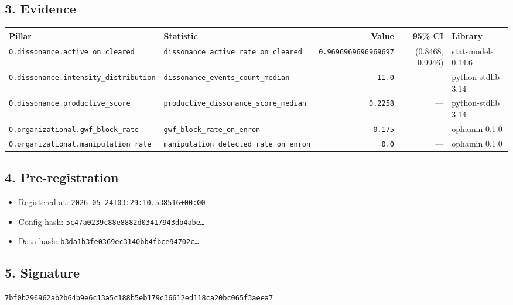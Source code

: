 \documentclass{article}
\begin{document}
\subsection*{3. Evidence}
\begin{tabular}{llrrl}\toprule
\textbf{Pillar} & \textbf{Statistic} & \textbf{Value} & \textbf{95\% CI} & \textbf{Library} \\\midrule
\texttt{O.dissonance.active\_on\_cleared} & \texttt{dissonance\_active\_rate\_on\_cleared} & \texttt{0.9696969696969697} & (0.8468, 0.9946) & statsmodels 0.14.6 \\
\texttt{O.dissonance.intensity\_distribution} & \texttt{dissonance\_events\_count\_median} & \texttt{11.0} & --- & python-stdlib 3.14 \\
\texttt{O.dissonance.productive\_score} & \texttt{productive\_dissonance\_score\_median} & \texttt{0.2258} & --- & python-stdlib 3.14 \\
\texttt{O.organizational.gwf\_block\_rate} & \texttt{gwf\_block\_rate\_on\_enron} & \texttt{0.175} & --- & ophamin 0.1.0 \\
\texttt{O.organizational.manipulation\_rate} & \texttt{manipulation\_detected\_rate\_on\_enron} & \texttt{0.0} & --- & ophamin 0.1.0 \\
\bottomrule\end{tabular}
\subsection*{4. Pre-registration}
\begin{itemize}
\item Registered at: \texttt{2026-05-24T03:29:10.538516+00:00}
\item Config hash: \texttt{5c47a0239c88e8882d03417943db4abe\dots}
\item Data hash: \texttt{b3da1b3fe0369ec3140bb4fbce94702c\dots}
\end{itemize}
\subsection*{5. Signature}
\texttt{7bf0b296962ab2b64b9e6c13a5c188b5eb179c36612ed118ca20bc065f3aeea7}\\
\end{document}
